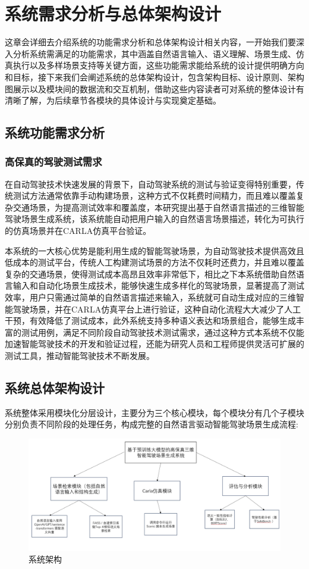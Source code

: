 \chapter{系统需求分析与总体架构设计}
这章会详细去介绍系统的功能需求分析和总体架构设计相关内容，一开始我们要深入分析系统需满足的功能需求，其中涵盖自然语言输入、语义理解、场景生成、仿真执行以及多样场景支持等关键方面，这些功能需求能给系统的设计提供明确方向和目标，接下来我们会阐述系统的总体架构设计，包含架构目标、设计原则、架构图展示以及模块间的数据流和交互机制，借助这些内容读者可对系统的整体设计有清晰了解，为后续章节各模块的具体设计与实现奠定基础。
\section{系统功能需求分析}
\subsection{高保真的驾驶测试需求}
在自动驾驶技术快速发展的背景下，自动驾驶系统的测试与验证变得特别重要，传统测试方法通常依靠手动构建场景，这种方式不仅耗费时间精力，而且难以覆盖复杂交通场景，为提高测试效率和覆盖度，本研究提出基于自然语言描述的三维智能驾驶场景生成系统，该系统能自动把用户输入的自然语言场景描述，转化为可执行的仿真场景并在CARLA仿真平台验证。

本系统的一大核心优势是能利用生成的智能驾驶场景，为自动驾驶技术提供高效且低成本的测试平台，传统人工构建测试场景的方法不仅耗时还费力，并且难以覆盖复杂的交通场景，使得测试成本高昂且效率非常低下，相比之下本系统借助自然语言输入和自动化场景生成技术，能够快速生成多样化的驾驶场景，显著提高了测试效率，用户只需通过简单的自然语言描述来输入，系统就可自动生成对应的三维智能驾驶场景，并在CARLA仿真平台上进行验证，这种自动化流程大大减少了人工干预，有效降低了测试成本，此外系统支持多种语义表达和场景组合，能够生成丰富的测试用例，满足不同阶段自动驾驶技术测试需求，通过这种方式本系统不仅能加速智能驾驶技术的开发和验证过程，还能为研究人员和工程师提供灵活可扩展的测试工具，推动智能驾驶技术不断发展。


\section{系统总体架构设计}
系统整体采用模块化分层设计，主要分为三个核心模块，每个模块分有几个子模块分别负责不同阶段的处理任务，构成完整的自然语言驱动智能驾驶场景生成流程:
\begin{figure}[H]
	\centering
	\includegraphics[width=1.0\textwidth]{images/系统架构图.pdf}
	\caption{系统架构}
	\label{fig:system-architecture}
\end{figure}
